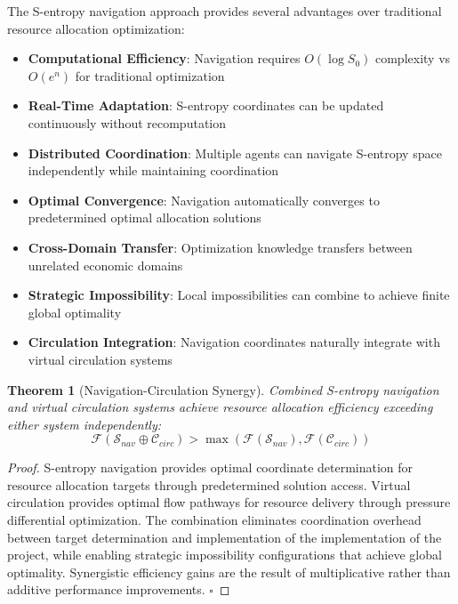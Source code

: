 \documentclass[12pt,a4paper]{article}
\newtheorem{theorem}{Theorem}
\begin{document}
The S-entropy navigation approach provides several advantages over traditional resource allocation optimization:
\begin{itemize}
\item \textbf{Computational Efficiency}: Navigation requires $O(\log S_0)$ complexity vs $O(e^n)$ for traditional optimization
\item \textbf{Real-Time Adaptation}: S-entropy coordinates can be updated continuously without recomputation
\item \textbf{Distributed Coordination}: Multiple agents can navigate S-entropy space independently while maintaining coordination
\item \textbf{Optimal Convergence}: Navigation automatically converges to predetermined optimal allocation solutions
\item \textbf{Cross-Domain Transfer}: Optimization knowledge transfers between unrelated economic domains
\item \textbf{Strategic Impossibility}: Local impossibilities can combine to achieve finite global optimality
\item \textbf{Circulation Integration}: Navigation coordinates naturally integrate with virtual circulation systems
\end{itemize}

\begin{theorem}[Navigation-Circulation Synergy]
Combined S-entropy navigation and virtual circulation systems achieve resource allocation efficiency exceeding either system independently:
\begin{equation}
\mathcal{F}(\mathcal{S}_{nav} \oplus \mathcal{C}_{circ}) > \max(\mathcal{F}(\mathcal{S}_{nav}), \mathcal{F}(\mathcal{C}_{circ}))
\end{equation}
\end{theorem}

\begin{proof}
S-entropy navigation provides optimal coordinate determination for resource allocation targets through predetermined solution access. Virtual circulation provides optimal flow pathways for resource delivery through pressure differential optimization. The combination eliminates coordination overhead between target determination and implementation of the implementation of the project, while enabling strategic impossibility configurations that achieve global optimality. Synergistic efficiency gains are the result of multiplicative rather than additive performance improvements. $\square$
\end{proof}
\end{document}
